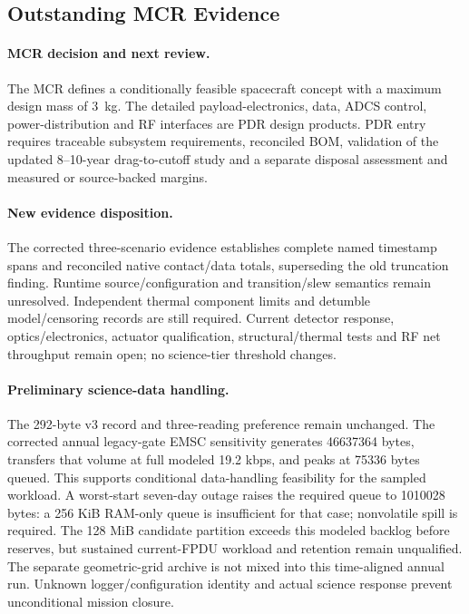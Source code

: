 \subsection{Outstanding MCR Evidence}
\paragraph{MCR decision and next review.} The MCR defines a conditionally feasible spacecraft concept with a maximum design mass of 3~kg. The detailed payload-electronics, data, ADCS control, power-distribution and RF interfaces are PDR design products. PDR entry requires traceable subsystem requirements, reconciled BOM, validation of the updated 8--10-year drag-to-cutoff study and a separate disposal assessment and measured or source-backed margins.

\paragraph{New evidence disposition.}
The corrected three-scenario evidence establishes complete named timestamp spans and reconciled native contact/data totals, superseding the old truncation finding. Runtime source/configuration and transition/slew semantics remain unresolved. Independent thermal component limits and detumble model/censoring records are still required. Current detector response, optics/electronics, actuator qualification, structural/thermal tests and RF net throughput remain open; no science-tier threshold changes.

\paragraph{Preliminary science-data handling.}
The 292-byte v3 record and three-reading preference remain unchanged. The corrected annual legacy-gate EMSC sensitivity generates 46637364 bytes, transfers that volume at full modeled 19.2 kbps, and peaks at 75336 bytes queued. This supports conditional data-handling feasibility for the sampled workload. A worst-start seven-day outage raises the required queue to 1010028 bytes: a 256 KiB RAM-only queue is insufficient for that case; nonvolatile spill is required. The 128 MiB candidate partition exceeds this modeled backlog before reserves, but sustained current-FPDU workload and retention remain unqualified. The separate geometric-grid archive is not mixed into this time-aligned annual run. Unknown logger/configuration identity and actual science response prevent unconditional mission closure.

